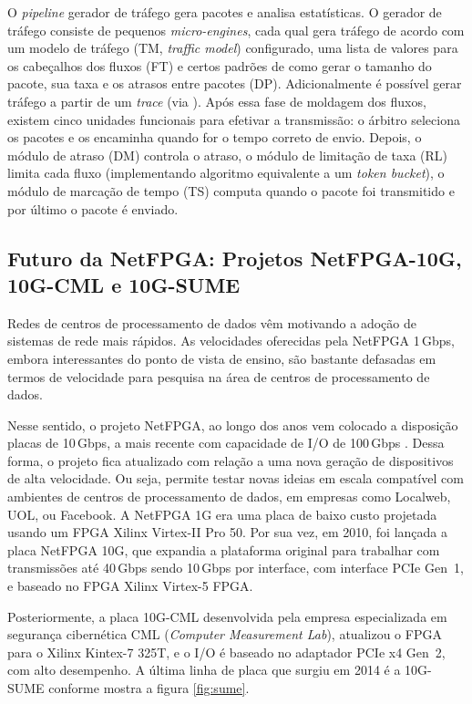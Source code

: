 O \textit{pipeline} gerador de tráfego gera pacotes e analisa
estatísticas. O gerador de tráfego consiste de pequenos
\textit{micro-engines}, cada qual gera tráfego de acordo com um modelo
de tráfego (TM, \emph{traffic model}) configurado, uma lista de valores
para os cabeçalhos dos fluxos (FT) e certos padrões de como gerar o
tamanho do pacote, sua taxa e os atrasos entre pacotes (DP).
Adicionalmente é possível gerar tráfego a partir de um \textit{trace}
 (via ). Após essa fase de moldagem dos fluxos,
existem cinco unidades funcionais para efetivar a transmissão: o árbitro
seleciona os pacotes e os encaminha quando for o tempo correto de envio.
Depois, o módulo de atraso (DM) controla o atraso, o módulo de limitação
de taxa (RL) limita cada fluxo (implementando algoritmo equivalente a um
\emph{token bucket}), o módulo de marcação de tempo (TS) computa quando
o pacote foi transmitido e por último o pacote é enviado.

\subsection{Futuro da NetFPGA: Projetos NetFPGA-10G, 10G-CML e 10G-SUME}

Redes de centros de processamento de dados vêm motivando a adoção de
sistemas de rede mais rápidos. As velocidades oferecidas pela NetFPGA
1\,Gbps, embora interessantes do ponto de vista de ensino, são bastante
defasadas em termos de velocidade para pesquisa na área de centros de
processamento de dados.

Nesse sentido, o projeto NetFPGA, ao longo dos anos vem colocado a
disposição placas de 10\,Gbps, a mais recente com capacidade de I/O de
100\,Gbps \cite{6866035}. Dessa forma, o projeto fica atualizado com
relação a uma nova geração de dispositivos de alta velocidade. Ou seja,
permite testar novas ideias em escala compatível com ambientes de
centros de processamento de dados, em empresas como Localweb, UOL, ou
Facebook. A NetFPGA 1G era uma placa de baixo custo projetada usando um
FPGA Xilinx Virtex-II Pro 50. Por sua vez, em 2010, foi lançada a placa
NetFPGA 10G, que expandia a plataforma original para trabalhar com
transmissões até 40\,Gbps sendo 10\,Gbps por interface, com interface
PCIe Gen~1, e baseado no FPGA Xilinx Virtex-5 FPGA.

Posteriormente, a placa 10G-CML desenvolvida pela empresa especializada
em segurança cibernética CML (\textit{Computer Measurement Lab}),
atualizou o FPGA para o Xilinx Kintex-7 325T, e o I/O é baseado no
adaptador PCIe x4 Gen~2, com alto desempenho. A última linha de placa
que surgiu em 2014 é a 10G-SUME \cite{6866035} conforme mostra a figura
\ref{fig:sume}.

